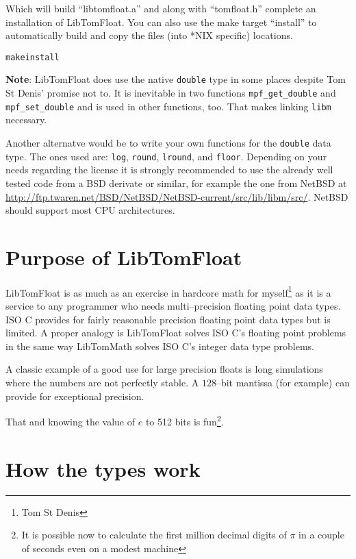 \documentclass[a4paper]{book}
\theoremstyle{definition}
\theoremstyle{remark}
\begin{document}
Which will build ``libtomfloat.a'' and along with ``tomfloat.h'' complete an installation of LibTomFloat.  You can also use the make target ``install'' to automatically build and copy the files (into *NIX specific) locations.  

\begin{alltt}
make install
\end{alltt}

\textbf{Note}: LibTomFloat does use the native {\texttt {double}} type in some places despite Tom St Denis' promise not to. It is inevitable in two functions {\texttt {mpf\_get\_double}} and {\texttt {mpf\_set\_double}} and is used in other functions, too. That makes linking {\texttt {libm}} necessary.

Another alternatve would be to write your own functions for the {\texttt{double}} data type. The ones used are: {\texttt{log}}, {\texttt{round}}, {\texttt{lround}}, and {\texttt{floor}}. Depending on your needs regarding the license it is strongly recommended to use the already well tested code from a BSD derivate or similar, for example the one from NetBSD at 
\url{http://ftp.twaren.net/BSD/NetBSD/NetBSD-current/src/lib/libm/src/}. NetBSD should support most CPU architectures.


\section{Purpose of LibTomFloat}
LibTomFloat is as much as an exercise in hardcore math for myself\footnote{Tom St Denis} as it is a service to any programmer who needs multi--precision floating point data types. ISO C provides for fairly reasonable precision floating point data types but is limited. A proper analogy is LibTomFloat solves ISO C's floating point problems in the same way LibTomMath solves ISO C's integer data type problems.

A classic example of a good use for large precision floats is long simulations where the numbers are not perfectly stable.  A $128$--bit mantissa (for example) can provide for exceptional precision.

That and knowing the value of $e$ to 512 bits is fun\footnote{It is possible now to calculate the first million decimal digits of $\pi$ in a couple of seconds even on a modest machine}.

\section{How the types work}
\end{document}
